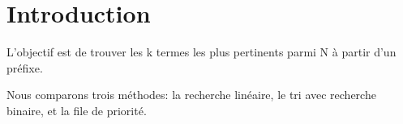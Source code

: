 \section*{Introduction}

L'objectif est de trouver les k termes les plus pertinents parmi N à partir d'un préfixe.

Nous comparons trois méthodes:
    la recherche linéaire,
    le tri avec recherche binaire,
    et la file de priorité.
